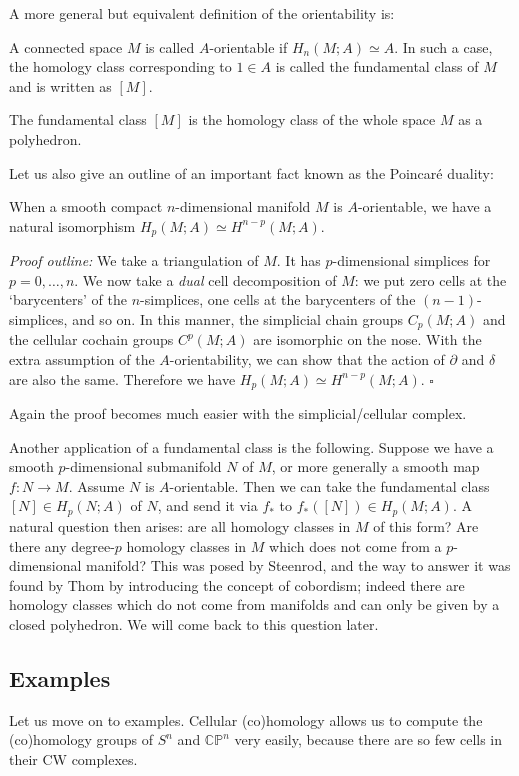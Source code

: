 \documentclass[12pt]{article}
\numberwithin{equation}{section}
\numberwithin{figure}{section}
\theoremstyle{remark}
\renewenvironment{proof}{\noindent\textsl{Proof outline:}}{\hfill$\square$}
\def\CP{\mathbb{CP}}
\begin{document}
A more general but equivalent definition of the orientability is:
\begin{definition}
  A connected space $M$ is called $A$-orientable if $H_n(M;A)\simeq A$.
  In such a case, the homology class  corresponding to $1\in A$ 
  is called the fundamental class of $M$ and is written as $[M]$.
\end{definition}
The fundamental class $[M]$ is the homology class of the whole space $M$
as a polyhedron.

Let us also give an outline of an important fact known as the Poincar\'e duality:
\begin{theorem}
  When a smooth compact $n$-dimensional manifold $M$ is $A$-orientable,
  we have a natural isomorphism $H_p(M;A)\simeq H^{n-p}(M;A)$.
\end{theorem}

  
\begin{proof}
  We take a triangulation of $M$.
  It has $p$-dimensional simplices for $p=0,\ldots,n$.
  We now take a \emph{dual} cell decomposition of $M$:
  we put zero cells at the `barycenters' of the $n$-simplices,
  one cells at the barycenters of the $(n-1)$-simplices, and so on.
  In this manner, the simplicial chain groups $C_p(M;A)$ 
  and the cellular cochain groups $C^p(M;A)$ are isomorphic on the nose.
  With the extra assumption of the $A$-orientability,
  we can show that the action of $\partial$ and $\delta$ are also the same.
  Therefore we have $H_p(M;A)\simeq H^{n-p}(M;A)$.
\end{proof}

Again the proof becomes much easier with the simplicial/cellular complex.

Another application of a fundamental class is the following.
Suppose we have a smooth $p$-dimensional submanifold $N$ of $M$,
or more generally a smooth map $f:N\to M$.
Assume $N$ is $A$-orientable.
Then we can take the fundamental class $[N]\in H_p(N;A)$ of $N$,
and send it via $f_*$ to $f_*([N])\in H_p(M;A)$.
A natural question then arises: are all homology classes in $M$ of this form?
Are there any degree-$p$ homology classes in $M$ which does not come 
from a $p$-dimensional manifold?
This was posed by Steenrod, and the way to answer it was found by Thom
by introducing the concept of cobordism;
indeed there are homology classes which do not come from manifolds
and can only be given by a closed polyhedron.
We will come back to this question later.

\subsection{Examples}
Let us move on to examples. 
Cellular (co)homology allows us to compute the (co)homology groups of $S^n$ and $\CP^n$ very easily, 
because there are so few cells in their CW complexes.
\end{document}
